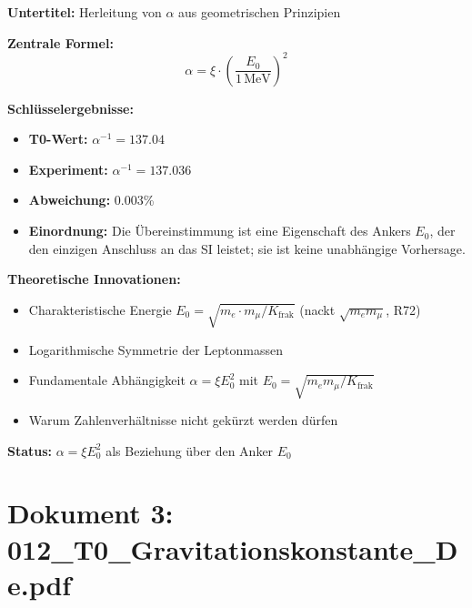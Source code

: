 	\begin{documentbox}
		\textbf{Untertitel:} Herleitung von $\alpha$ aus geometrischen Prinzipien
		
		\textbf{Zentrale Formel:}
		\begin{equation}
			\boxed{\alpha = \xi \cdot \left(\frac{E_0}{1\,\text{MeV}}\right)^2}
		\end{equation}
		
		\textbf{Schlüsselergebnisse:}
		\begin{itemize}
			\item \textbf{T0-Wert:} $\alpha^{-1} = 137.04$
			\item \textbf{Experiment:} $\alpha^{-1} = 137.036$
			\item \textbf{Abweichung:} 0.003\%
			\item \textbf{Einordnung:} Die Übereinstimmung ist eine Eigenschaft des Ankers $E_0$, der den einzigen Anschluss an das SI leistet; sie ist keine unabhängige Vorhersage.
		\end{itemize}
		
		\textbf{Theoretische Innovationen:}
		\begin{itemize}
			\item Charakteristische Energie $E_0 = \sqrt{m_e \cdot m_\mu/K_{\text{frak}}}$ (nackt $\sqrt{m_e m_\mu}$, R72)
			\item Logarithmische Symmetrie der Leptonmassen
			\item Fundamentale Abhängigkeit $\alpha = \xi E_0^2$ mit $E_0 = \sqrt{m_e m_\mu/K_{\text{frak}}}$
			\item Warum Zahlenverhältnisse nicht gekürzt werden dürfen
		\end{itemize}
		
		\textbf{Status:} $\alpha = \xi E_0^2$ als Beziehung über den Anker $E_0$
	\end{documentbox}
	
	\section{Dokument 3: 012\_T0\_Gravitationskonstante\_De.pdf}
	

